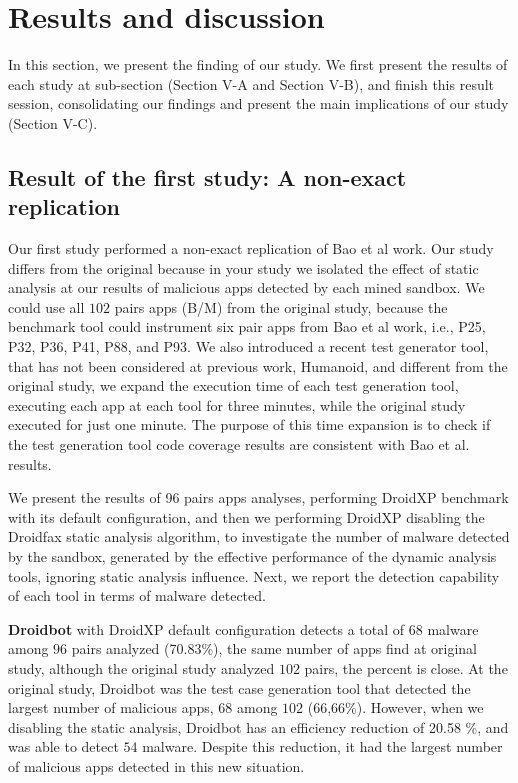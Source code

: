 \section{Results and discussion}

In this section, we present the finding of our study. We first present the results of each study at sub-section (Section V-A and Section V-B), and finish this result session, consolidating our findings and present the main implications of our study (Section V-C).

\subsection{Result of the first study: A non-exact replication}

Our first study performed a non-exact replication of Bao et al work. Our study differs from the original because in your study we isolated the effect of static analysis at our results of malicious apps detected by each mined sandbox. We could use all $102$ pairs apps (B/M) from the original study, because the benchmark tool could instrument six pair apps from Bao et al work, i.e., P25, P32, P36, P41, P88, and P93. We also introduced a recent test generator tool, that has not been considered at previous work, Humanoid, and different from the original study, we expand the execution time of each test generation tool, executing each app at each tool for three minutes, while the original study executed for just one minute. The purpose of this time expansion is to check if the test generation tool code coverage results are consistent with Bao et al. results.

We present the results of 96 pairs apps analyses, performing DroidXP benchmark with its default configuration, and then we performing DroidXP disabling the Droidfax static analysis algorithm, to investigate the number of malware detected by the sandbox, generated by the effective performance of the dynamic analysis tools, ignoring static analysis influence. Next, we report the detection capability of each tool in terms of malware detected.

\textbf{Droidbot} with DroidXP default configuration detects a total of 68 malware among $96$ pairs analyzed (70.83\%), the same number of apps find at original study, although the original study analyzed $102$ pairs, the percent is close. At the original study, Droidbot was the test case generation tool that detected the largest number of malicious apps, 68 among $102$ (66,66\%). However, when we disabling the static analysis, Droidbot has an efficiency reduction of 20.58 \%, and was able to detect $54$ malware. Despite this reduction, it had the largest number of malicious apps detected in this new situation.

